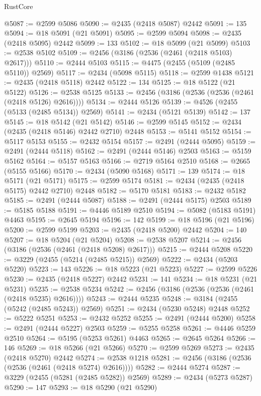 \begin{lexlean}{RustCore}
\begin{coremodule}
@5087 := @2599 @5086
@5090 := @2435 (@2418 @5087) @2442
@5091 := 135
@5094 := @18 @5091 (@21 @5091)
@5095 := @2599 @5094
@5098 := @2435 (@2418 @5095) @2442
@5099 := 133
@5102 := @18 @5099 (@21 @5099)
@5103 := @2538 @5102
@5109 := @2456 (@3186 (@2536 (@2461 (@2418 @5103) @2617)))
@5110 := @2444 @5103
@5115 := @4475 (@2455 (@5109 (@2485 @5110)) @2569)
@5117 := @2434 (@5098 @5115)
@5118 := @2599 @1438
@5121 := @2435 (@2418 @5118) @2442
@5122 := 134
@5125 := @18 @5122 (@21 @5122)
@5126 := @2538 @5125
@5133 := @2456 (@3186 (@2536 (@2536 (@2461 (@2418 @5126) @2616))))
@5134 := @2444 @5126
@5139 := @4526 (@2455 (@5133 (@2485 @5134)) @2569)
@5141 := @2434 (@5121 @5139)
@5142 := 137
@5145 := @18 @5142 (@21 @5142)
@5146 := @2599 @5145
@5152 := @2434 (@2435 (@2418 @5146) @2442 @2710) @2448
@5153 := @5141 @5152
@5154 := @5117 @5153
@5155 := @2432 @5154
@5157 := @2491 (@2444 @5095)
@5159 := @2491 (@2444 @5118)
@5162 := @2491 (@2444 @5146) @2503
@5163 := @5159 @5162
@5164 := @5157 @5163
@5166 := @2719 @5164 @2510
@5168 := @2665 (@5155 @5166)
@5170 := @2434 (@5090 @5168)
@5171 := 139
@5174 := @18 @5171 (@21 @5171)
@5175 := @2599 @5174
@5181 := @2434 (@2435 (@2418 @5175) @2442 @2710) @2448
@5182 := @5170 @5181
@5183 := @2432 @5182
@5185 := @2491 (@2444 @5087)
@5188 := @2491 (@2444 @5175) @2503
@5189 := @5185 @5188
@5191 := @4446 @5189 @2510
@5194 := @5082 (@5183 @5191) @4463
@5195 := @2645 @5194
@5196 := 142
@5199 := @18 @5196 (@21 @5196)
@5200 := @2599 @5199
@5203 := @2435 (@2418 @5200) @2442
@5204 := 140
@5207 := @18 @5204 (@21 @5204)
@5208 := @2538 @5207
@5214 := @2456 (@3186 (@2536 (@2461 (@2418 @5208) @2617)))
@5215 := @2444 @5208
@5220 := @3229 (@2455 (@5214 (@2485 @5215)) @2569)
@5222 := @2434 (@5203 @5220)
@5223 := 143
@5226 := @18 @5223 (@21 @5223)
@5227 := @2599 @5226
@5230 := @2435 (@2418 @5227) @2442
@5231 := 141
@5234 := @18 @5231 (@21 @5231)
@5235 := @2538 @5234
@5242 := @2456 (@3186 (@2536 (@2536 (@2461 (@2418 @5235) @2616))))
@5243 := @2444 @5235
@5248 := @3184 (@2455 (@5242 (@2485 @5243)) @2569)
@5251 := @2434 (@5230 @5248) @2448
@5252 := @5222 @5251
@5253 := @2432 @5252
@5255 := @2491 (@2444 @5200)
@5258 := @2491 (@2444 @5227) @2503
@5259 := @5255 @5258
@5261 := @4446 @5259 @2510
@5264 := @5195 (@5253 @5261) @4463
@5265 := @2645 @5264
@5266 := 146
@5269 := @18 @5266 (@21 @5266)
@5270 := @2599 @5269
@5273 := @2435 (@2418 @5270) @2442
@5274 := @2538 @1218
@5281 := @2456 (@3186 (@2536 (@2536 (@2461 (@2418 @5274) @2616))))
@5282 := @2444 @5274
@5287 := @3229 (@2455 (@5281 (@2485 @5282)) @2569)
@5289 := @2434 (@5273 @5287)
@5290 := 147
@5293 := @18 @5290 (@21 @5290)

\end{coremodule}
\end{lexlean}
